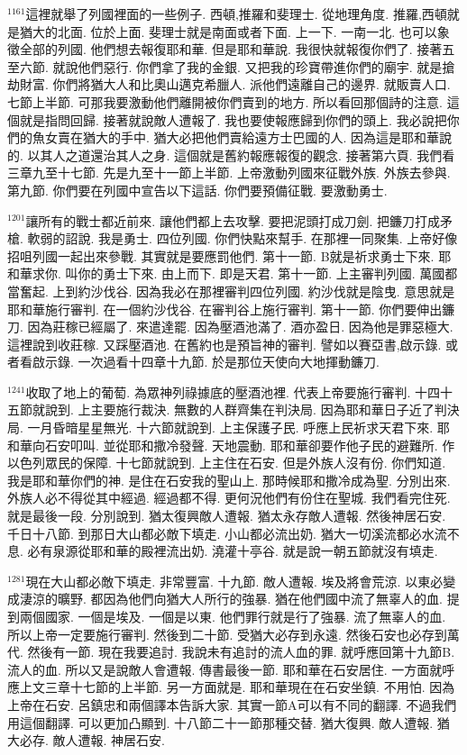 \documentclass{book}
\begin{document}
$^{1161}$這裡就舉了列國裡面的一些例子.
西頓,推羅和斐理士.
從地理角度.
推羅,西頓就是猶大的北面.
位於上面.
斐理士就是南面或者下面.
上一下.
一南一北.
也可以象徵全部的列國.
他們想去報復耶和華.
但是耶和華說.
我很快就報復你們了.
接著五至六節.
就說他們惡行.
你們拿了我的金銀.
又把我的珍寶帶進你們的廟宇.
就是搶劫財富.
你們將猶大人和比奧山邁克希臘人.
派他們遠離自己的邊界.
就販賣人口.
七節上半節.
可那我要激動他們離開被你們賣到的地方.
所以看回那個詩的注意.
這個就是指問回歸.
接著就說敵人遭報了.
我也要使報應歸到你們的頭上.
我必說把你們的魚女賣在猶大的手中.
猶大必把他們賣給遠方士巴國的人.
因為這是耶和華說的.
以其人之道還治其人之身.
這個就是舊約報應報復的觀念.
接著第六頁.
我們看三章九至十七節.
先是九至十一節上半節.
上帝激動列國來征戰外族.
外族去參與.
第九節.
你們要在列國中宣告以下這話.
你們要預備征戰.
要激動勇士.

$^{1201}$讓所有的戰士都近前來.
讓他們都上去攻擊.
要把泥頭打成刀劍.
把鐮刀打成矛槍.
軟弱的詔說.
我是勇士.
四位列國.
你們快點來幫手.
在那裡一同聚集.
上帝好像招咀列國一起出來參戰.
其實就是要應罰他們.
第十一節.
B就是祈求勇士下來.
耶和華求你.
叫你的勇士下來.
由上而下.
即是天君.
第十一節.
上主審判列國.
萬國都當奮起.
上到約沙伐谷.
因為我必在那裡審判四位列國.
約沙伐就是陰曳.
意思就是耶和華施行審判.
在一個約沙伐谷.
在審判谷上施行審判.
第十一節.
你們要伸出鐮刀.
因為莊稼已經屬了.
來遣達罷.
因為壓酒池滿了.
酒亦盈日.
因為他是罪惡極大.
這裡說到收莊稼.
又踩壓酒池.
在舊約也是預旨神的審判.
譬如以賽亞書,啟示錄.
或者看啟示錄.
一次過看十四章十九節.
於是那位天使向大地揮動鐮刀.

$^{1241}$收取了地上的葡萄.
為眾神列祿據底的壓酒池裡.
代表上帝要施行審判.
十四十五節就說到.
上主要施行裁決.
無數的人群齊集在判決局.
因為耶和華日子近了判決局.
一月昏暗星星無光.
十六節就說到.
上主保護子民.
呼應上民祈求天君下來.
耶和華向石安叩叫.
並從耶和撒冷發聲.
天地震動.
耶和華卻要作他子民的避難所.
作以色列眾民的保障.
十七節就說到.
上主住在石安.
但是外族人沒有份.
你們知道.
我是耶和華你們的神.
是住在石安我的聖山上.
那時候耶和撒冷成為聖.
分別出來.
外族人必不得從其中經過.
經過都不得.
更何況他們有份住在聖城.
我們看完住死.
就是最後一段.
分別說到.
猶太復興敵人遭報.
猶太永存敵人遭報.
然後神居石安.
千日十八節.
到那日大山都必敵下填走.
小山都必流出奶.
猶大一切溪流都必水流不息.
必有泉源從耶和華的殿裡流出奶.
澆灌十亭谷.
就是說一朝五節就沒有填走.

$^{1281}$現在大山都必敵下填走.
非常豐富.
十九節.
敵人遭報.
埃及將會荒涼.
以東必變成淒涼的曠野.
都因為他們向猶大人所行的強暴.
猶在他們國中流了無辜人的血.
提到兩個國家.
一個是埃及.
一個是以東.
他們罪行就是行了強暴.
流了無辜人的血.
所以上帝一定要施行審判.
然後到二十節.
受猶大必存到永遠.
然後石安也必存到萬代.
然後有一節.
現在我要追討.
我說未有追討的流人血的罪.
就呼應回第十九節B.
流人的血.
所以又是說敵人會遭報.
傳書最後一節.
耶和華在石安居住.
一方面就呼應上文三章十七節的上半節.
另一方面就是.
耶和華現在在石安坐鎮.
不用怕.
因為上帝在石安.
呂鎮忠和兩個譯本告訴大家.
其實一節A可以有不同的翻譯.
不過我們用這個翻譯.
可以更加凸顯到.
十八節二十一節那種交替.
猶大復興.
敵人遭報.
猶大必存.
敵人遭報.
神居石安.
\end{document}
